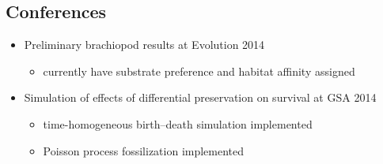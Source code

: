 \documentclass[12pt,letterpaper]{article}
\begin{document}
\subsection{Conferences}
\begin{itemize}
  \item Preliminary brachiopod results at Evolution 2014
    \begin{itemize}
      \item currently have substrate preference and habitat affinity assigned
    \end{itemize}
  \item Simulation of effects of differential preservation on survival at GSA 2014
    \begin{itemize}
      \item time-homogeneous birth--death simulation implemented
      \item Poisson process fossilization implemented
    \end{itemize}
\end{itemize}
\end{document}
